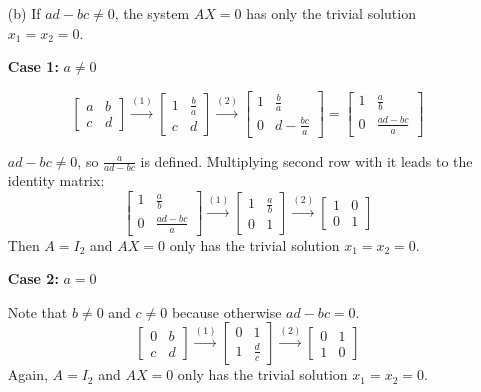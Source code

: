\documentclass{article}
\begin{document}
\begin{enumerate}[listparindent=\parindent]
\begin{enumerate}
\item[(b)] If \(ad - bc \neq 0\), the system \(AX = 0\) has only the trivial solution \(x_1 = x_2 = 0\).

\textbf{Case 1:} \(a \neq 0\)

\[
    \begin{bmatrix}
        a & b \\
        c & d
    \end{bmatrix}
    \xrightarrow{(1)}
    \begin{bmatrix}
        1 & \frac{b}{a} \\
        c & d
    \end{bmatrix}
    \xrightarrow{(2)}
    \begin{bmatrix}
        1 & \frac{b}{a} \\
        0 & d - \frac{bc}{a}
    \end{bmatrix}
    =
    \begin{bmatrix}
        1 & \frac{a}{b} \\
        0 & \frac{ad - bc}{a}
    \end{bmatrix}
\]

\(ad - bc \neq 0\), so \( \frac{a}{ad - bc} \) is defined. Multiplying second row with it leads to the identity matrix:
\[
    \begin{bmatrix}
        1 & \frac{a}{b} \\
        0 & \frac{ad - bc}{a}
    \end{bmatrix}
    \xrightarrow{(1)}
    \begin{bmatrix}
        1 & \frac{a}{b} \\
        0 & 1
    \end{bmatrix}
    \xrightarrow{(2)}
    \begin{bmatrix}
        1 & 0 \\
        0 & 1
    \end{bmatrix}
\]
Then \(A = I_2\) and \(AX = 0\) only has the trivial solution \(x_1 = x_2 = 0\).

\textbf{Case 2:} \(a = 0\)

Note that \(b \neq 0\) and \(c \neq 0\) because otherwise \(ad - bc = 0\).
\[
    \begin{bmatrix}
        0 & b \\
        c & d
    \end{bmatrix}
    \xrightarrow{(1)}
    \begin{bmatrix}
        0 & 1 \\
        1 & \frac{d}{c}
    \end{bmatrix}
    \xrightarrow{(2)}
    \begin{bmatrix}
        0 & 1 \\
        1 & 0
    \end{bmatrix}
\]
Again, \(A = I_2\) and \(AX = 0\) only has the trivial solution \(x_1 = x_2 = 0\).


\end{enumerate}
\end{enumerate}
\end{document}
